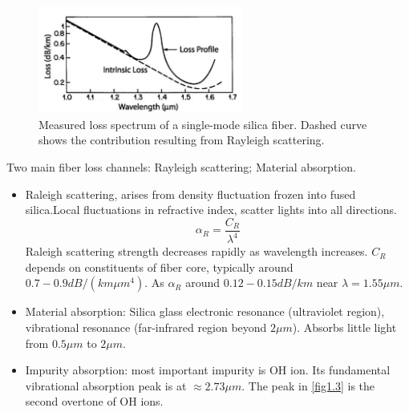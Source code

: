 \documentclass[12pt]{extarticle}
\numberwithin{equation}{section}
\numberwithin{figure}{section}
\numberwithin{table}{section}
\newcommand{\<}{\langle}
\renewcommand{\>}{\rangle}
\theoremstyle{definition}
\begin{document}
            
            \begin{figure}[htbp]
                \centering
                \includegraphics[width=0.6\textwidth]{images/fig1.3.PNG}
                \caption{Measured loss spectrum of a single-mode silica ﬁber. Dashed curve shows the contribution resulting from Rayleigh scattering.}
                \label{fig1.3}
            \end{figure}
            
            Two main fiber loss channels: Rayleigh scattering; Material absorption.
            \begin{itemize}
                \item Raleigh scattering, arises from density fluctuation frozen into fused silica.Local fluctuations in refractive index, scatter lights into all directions.
                    \begin{equation}
                        \alpha_R = \frac{C_R}{\lambda^4}
                    \end{equation}
                    Raleigh scattering strength decreases rapidly as wavelength increases. $C_R$ depends on constituents of fiber core, typically around $0.7-0.9 dB/(km \mu m^4)$. As $\alpha_R$ around $0.12-0.15 dB/km$ near $\lambda = 1.55 \mu m$.
                \item Material absorption: Silica glass electronic resonance (ultraviolet region), vibrational resonance (far-infrared region beyond $2 \mu m$). Absorbs little light from $0.5 \mu m$ to $2 \mu m$.
                \item Impurity absorption: most important impurity is OH ion. Its fundamental vibrational absorption peak is at $\approx 2.73 \mu m$. The peak in \autoref{fig1.3} is the second overtone of OH ions.
            \end{itemize}
            
\end{document}
